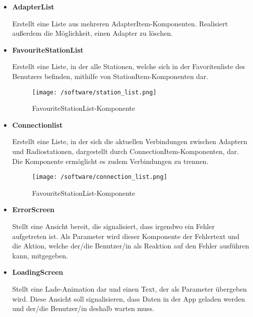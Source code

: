 \documentclass[11pt, twoside]{article}
\begin{document}
\begin{itemize}
	\item \textbf{AdapterList} \par
	\begin{minipage}{\linewidth}
	Erstellt eine Liste aus mehreren AdapterItem-Komponenten. Realisiert außerdem die Möglichkeit, einen Adapter zu löschen.
	\end{minipage}

	\item \textbf{FavouriteStationList} \par
	\begin{minipage}{\linewidth}
	Erstellt eine Liste, in der alle Stationen, welche sich in der Favoritenliste des Benutzers befinden, mithilfe von StationItem-Komponenten dar.
		\begin{figure}[H]
    			\captionsetup{type=figure}
     		\texttt{[image: /software/station\_list.png]}
    			\caption{FavouriteStationList-Komponente}
    		\end{figure}
    	\end{minipage}

	\item \textbf{Connectionlist} \par
	\begin{minipage}{\linewidth}
	Erstellt eine Liste, in der sich die aktuellen Verbindungen zwischen Adaptern und Radiostationen, dargestellt durch ConnectionItem-Komponenten, dar. Die Komponente ermöglicht es zudem Verbindungen zu trennen.
		\begin{figure}[H]
     		\texttt{[image: /software/connection\_list.png]}
    			\caption{FavouriteStationList-Komponente}
    		\end{figure}
    	\end{minipage}
\newpage
	\item \textbf{ErrorScreen} \par
	\begin{minipage}{\linewidth}
	Stellt eine Ansicht bereit, die signalisiert, dass irgendwo ein Fehler aufgetreten ist. Als Parameter wird dieser Komponente der Fehlertext und die Aktion, welche der/die Benutzer/in als Reaktion auf den Fehler ausführen kann, mitgegeben.
	\end{minipage}
	
	\item \textbf{LoadingScreen} \par
	\begin{minipage}{\linewidth}
	Stellt eine Lade-Animation dar und einen Text, der als Parameter übergeben wird. Diese Ansicht soll signalisieren, dass Daten in der App geladen werden und der/die Benutzer/in deshalb warten muss.
	\end{minipage}
\end{itemize}
\end{document}
